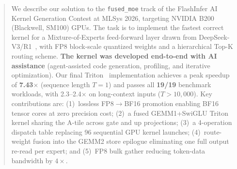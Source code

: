 \begin{abstract}
\noindent
We describe our solution to the \texttt{fused\_moe} track of the FlashInfer AI Kernel Generation Contest at MLSys 2026, targeting NVIDIA B200 (Blackwell, SM100) GPUs.
The task is to implement the fastest correct kernel for a Mixture-of-Experts feed-forward layer drawn from DeepSeek-V3/R1~\cite{deepseek}, with FP8 block-scale quantized weights and a hierarchical Top-K routing scheme.
\textbf{The kernel was developed end-to-end with AI assistance} (agent-assisted code generation, profiling, and iterative optimization).
Our final Triton~\cite{triton} implementation achieves a peak speedup of \textbf{7.43$\times$} (sequence length $T{=}1$) and passes all \textbf{19/19} benchmark workloads, with 2.3--2.4$\times$ on long-context inputs ($T{>}10{,}000$).
Key contributions are: (1)~lossless FP8$\to$BF16 promotion enabling BF16 tensor cores at zero precision cost; (2)~a fused GEMM1+SwiGLU Triton kernel sharing the A-tile across gate and up projections; (3)~a 4-operation dispatch table replacing 96 sequential GPU kernel launches; (4)~route-weight fusion into the GEMM2 store epilogue eliminating one full output re-read per expert; and (5)~FP8 bulk gather reducing token-data bandwidth by $4\times$.
\end{abstract}

